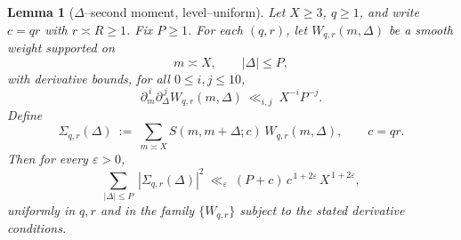 \documentclass[11pt]{article}
\newtheorem{lemma}{Lemma}[part]
\theoremstyle{definition}
\theoremstyle{remark}
\numberwithin{equation}{part}
\begin{document}
\begin{lemma}[{\boldmath $\Delta$--second moment, level--uniform}]
	\label{lem:delta-second-moment}
	Let $X\ge 3$, $q\ge 1$, and write $c=qr$ with $r\asymp R\ge 1$.
	Fix $P\ge 1$. For each $(q,r)$, let $W_{q,r}(m,\Delta)$ be a smooth weight supported on
	\[
		m\asymp X,\qquad |\Delta|\le P,
	\]
	with derivative bounds, for all $0\le i,j\le 10$,
	\[
		\partial_m^{\,i}\partial_\Delta^{\,j}W_{q,r}(m,\Delta)\ \ll_{i,j}\ X^{-i}P^{-j}.
	\]
	Define
	\[
		\Sigma_{q,r}(\Delta)\ :=\ \sum_{m\asymp X} S(m,m+\Delta;c)\,W_{q,r}(m,\Delta),
		\qquad c=qr.
	\]
	Then for every $\varepsilon>0$,
	\[
		\sum_{|\Delta|\le P}\ |\Sigma_{q,r}(\Delta)|^2
		\ \ll_{\varepsilon}\ (P+c)\,c^{\,1+2\varepsilon}\,X^{\,1+2\varepsilon},
	\]
	uniformly in $q,r$ and in the family $\{W_{q,r}\}$ subject to the stated derivative conditions.
\end{lemma}
\end{document}
